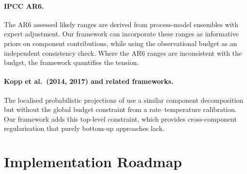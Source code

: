 \documentclass[11pt]{article}
\begin{document}
\paragraph{IPCC AR6.}  The AR6 assessed likely ranges are derived from process-model ensembles with expert adjustment.  Our framework can incorporate these ranges as informative priors on component contributions, while using the observational budget as an independent consistency check.  Where the AR6 ranges are inconsistent with the budget, the framework quantifies the tension.

\paragraph{Kopp et al.\ (2014, 2017) and related frameworks.}  The localised probabilistic projections of \citet{kopp2014probabilistic} use a similar component decomposition but without the global budget constraint from a rate--temperature calibration.  Our framework adds this top-level constraint, which provides cross-component regularisation that purely bottom-up approaches lack.


\section{Implementation Roadmap}
\label{sec:roadmap}
\end{document}
